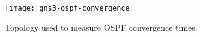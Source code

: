 \begin{figure}
  \centering
  \texttt{[image: gns3-ospf-convergence]}
  \caption{Topology used to measure OSPF convergence times}
  \label{fig:gns3-ospf-convergence}
\end{figure}
